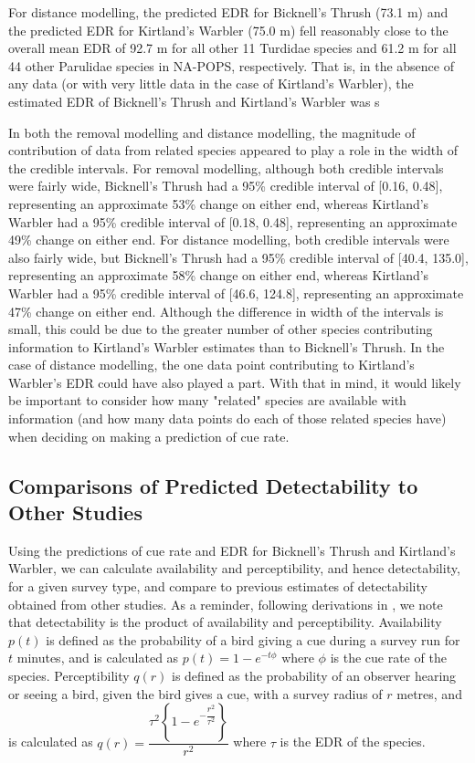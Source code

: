 \documentclass[12pt]{article}
\begin{document}
\par For distance modelling, the predicted EDR for Bicknell's Thrush (73.1 m) and the predicted EDR for Kirtland's Warbler (75.0 m) fell reasonably close to the overall mean EDR of 92.7 m for all other 11 Turdidae species and 61.2 m for all 44 other Parulidae species in NA-POPS, respectively.
That is, in the absence of any data (or with very little data in the case of Kirtland's Warbler), the estimated EDR of Bicknell's Thrush and Kirtland's Warbler was s

\par In both the removal modelling and distance modelling, the magnitude of contribution of data from related species appeared to play a role in the width of the credible intervals.
For removal modelling, although both credible intervals were fairly wide, Bicknell's Thrush had a 95\% credible interval of [0.16, 0.48], representing an approximate 53\% change on either end, whereas Kirtland's Warbler had a 95\% credible interval of [0.18, 0.48], representing an approximate 49\% change on either end.
For distance modelling, both credible intervals were also fairly wide, but Bicknell's Thrush had a 95\% credible interval of [40.4, 135.0], representing an approximate 58\% change on either end, whereas Kirtland's Warbler had a 95\% credible interval of [46.6, 124.8], representing an approximate 47\% change on either end.
Although the difference in width of the intervals is small, this could be due to the greater number of other species contributing information to Kirtland's Warbler estimates than to Bicknell's Thrush.
In the case of distance modelling, the one data point contributing to Kirtland's Warbler's EDR could have also played a part.
With that in mind, it would likely be important to consider how many "related" species are available with information (and how many data points do each of those related species have) when deciding on making a prediction of cue rate.

\subsection{Comparisons of Predicted Detectability to Other Studies}

\par Using the predictions of cue rate and EDR for Bicknell's Thrush and Kirtland's Warbler, we can calculate availability and perceptibility, and hence detectability, for a given survey type, and compare to previous estimates of detectability obtained from other studies.
As a reminder, following derivations in \citet{solymos_calibrating_2013}, we note that detectability is the product of availability and perceptibility.
Availability $p(t)$ is defined as the probability of a bird giving a cue during a survey run for $t$ minutes, and is calculated as
$p(t) = 1 - e^{-t\phi}$
where $\phi$ is the cue rate of the species.
Perceptibility $q(r)$ is defined as the probability of an observer hearing or seeing a bird, given the bird gives a cue, with a survey radius of $r$ metres, and is calculated as
$q(r) = \dfrac{\tau^2 \left\{1 - e^{-\dfrac{r^2}{\tau^2}}\right\}}{r^2}$
where $\tau$ is the EDR of the species.
\end{document}
